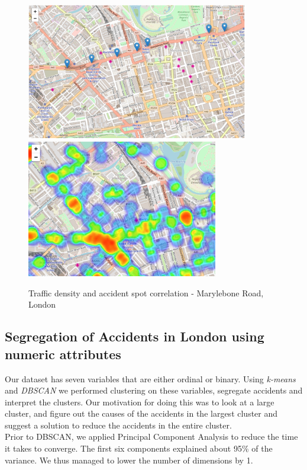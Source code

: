 \documentclass{neu_handout}
\begin{document}
\begin{figure}[!htb]
  \includegraphics[height=6cm, width=\linewidth]{traffic-bakers-street.png}
\endminipage\hfill
{}
  \includegraphics[height=6cm, width=\linewidth]{accident-2009-heatmap-bakers-street.png}
  \endminipage
\caption{Traffic density and accident spot correlation - Marylebone Road, London}  
\end{figure}



\subsection{Segregation of Accidents in London using numeric attributes}

Our dataset has seven variables that are either ordinal or binary. Using \textit{k-means} and \textit{DBSCAN} we performed clustering on these variables, segregate accidents and interpret the clusters. Our motivation for doing this was to look at a large cluster, and figure out the causes of the accidents in the largest cluster and suggest a solution to reduce the accidents in the entire cluster. \\

Prior to DBSCAN, we applied Principal Component Analysis to reduce the time it takes to converge.   The first six components explained about 95\% of the variance. We thus managed to lower the number of dimensions by 1. \\
\end{document}
